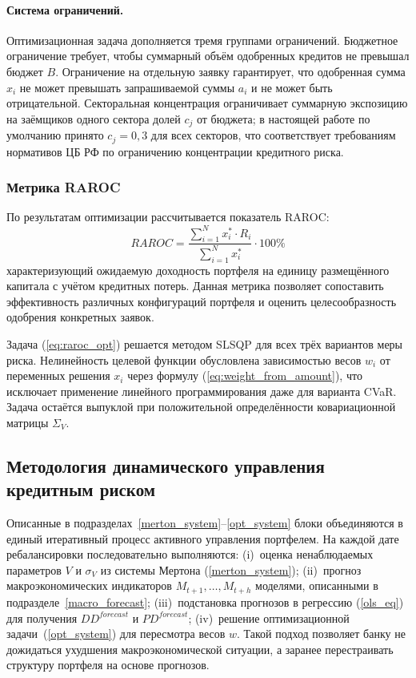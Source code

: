 \documentclass[]{article}
\begin{document}
	\paragraph{Система ограничений.}
	Оптимизационная задача дополняется тремя группами ограничений. Бюджетное ограничение требует,
	чтобы суммарный объём одобренных кредитов не превышал бюджет $B$. Ограничение на отдельную
	заявку гарантирует, что одобренная сумма $x_i$ не может превышать запрашиваемой суммы $a_i$
	и не может быть отрицательной. Секторальная концентрация ограничивает суммарную экспозицию
	на заёмщиков одного сектора долей $c_j$ от бюджета; в настоящей работе по умолчанию принято
	$c_j = 0{,}3$ для всех секторов, что соответствует требованиям нормативов ЦБ РФ по ограничению
	концентрации кредитного риска.

	\subsubsection{Метрика RAROC}

	По результатам оптимизации рассчитывается показатель RAROC:
	\begin{equation}
		\label{eq:raroc}
		RAROC = \frac{\sum_{i=1}^N x_i^* \cdot R_i}{\sum_{i=1}^N x_i^*} \cdot 100\%
	\end{equation}
	характеризующий ожидаемую доходность портфеля на единицу размещённого капитала с учётом
	кредитных потерь. Данная метрика позволяет сопоставить эффективность различных конфигураций
	портфеля и оценить целесообразность одобрения конкретных заявок.

	Задача (\ref{eq:raroc_opt}) решается методом SLSQP для всех трёх вариантов меры риска.
	Нелинейность целевой функции обусловлена зависимостью весов $w_i$ от переменных решения $x_i$
	через формулу (\ref{eq:weight_from_amount}), что исключает применение линейного программирования
	даже для варианта CVaR. Задача остаётся выпуклой при положительной определённости ковариационной
	матрицы $\Sigma_V$.

	\subsection{Методология динамического управления кредитным риском}

	Описанные в подразделах~\ref{merton_system}--\ref{opt_system} блоки объединяются в единый
	итеративный процесс активного управления портфелем. На каждой дате ребалансировки последовательно
	выполняются: (i)~оценка ненаблюдаемых параметров $V$ и $\sigma_V$ из системы Мертона
	(\ref{merton_system}); (ii)~прогноз макроэкономических индикаторов $M_{t+1},\dots,M_{t+h}$ моделями,
	описанными в подразделе~\ref{macro_forecast}; (iii)~подстановка
	прогнозов в регрессию (\ref{ols_eq}) для получения $DD^{forecast}$ и $PD^{forecast}$;
	(iv)~решение оптимизационной задачи~(\ref{opt_system}) для пересмотра весов $w$. Такой подход
	позволяет банку не дожидаться ухудшения макроэкономической ситуации, а заранее перестраивать
	структуру портфеля на основе прогнозов.
\end{document}
